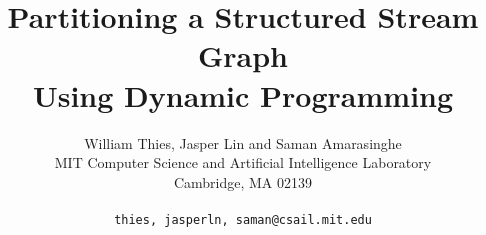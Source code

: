 \documentclass[10pt]{article}
\title{Partitioning a Structured Stream Graph \\ Using Dynamic Programming}
\author{William Thies, Jasper Lin and Saman Amarasinghe \\
  MIT Computer Science and Artificial Intelligence Laboratory\\
  Cambridge, MA  02139\\ \\
  \texttt{\symbol{`\{}thies, jasperln, saman\symbol{`\}}@csail.mit.edu}}
\date{}
\begin{document}
  \newtheorem{definition}{Definition}
  \newtheorem{transformation}{Transformation}
  \newcommand{\mt}[1]{\mbox{\it #1}}
  \newcommand{\todo}[1]{\framebox{\bf #1}}
  
\begin{singlespace}
  \maketitle
  
  \begin{abstract}
    
  \end{abstract}
\end{singlespace}

  
  
  
  
  
  
  
  \vspace{-8pt}
  

\begin{singlespace}
  \small
  \vspace{-8pt}
  
  
\end{singlespace}


  
\end{document}
